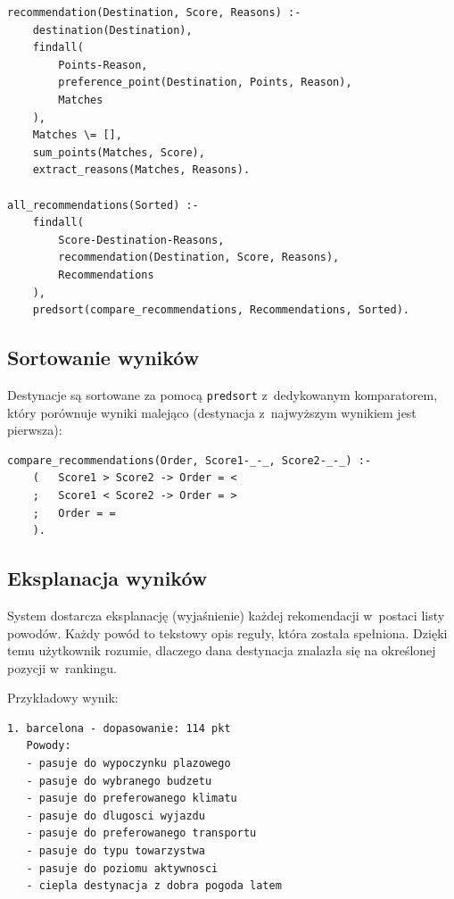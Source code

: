 \documentclass[12pt,a4paper]{article}
\begin{document}
\begin{lstlisting}[style=prolog, caption={Główny predykat rekomendacji}]
recommendation(Destination, Score, Reasons) :-
    destination(Destination),
    findall(
        Points-Reason,
        preference_point(Destination, Points, Reason),
        Matches
    ),
    Matches \= [],
    sum_points(Matches, Score),
    extract_reasons(Matches, Reasons).

all_recommendations(Sorted) :-
    findall(
        Score-Destination-Reasons,
        recommendation(Destination, Score, Reasons),
        Recommendations
    ),
    predsort(compare_recommendations, Recommendations, Sorted).
\end{lstlisting}

\subsection{Sortowanie wyników}

Destynacje są sortowane za pomocą \texttt{predsort} z~dedykowanym komparatorem, który porównuje wyniki malejąco (destynacja z~najwyższym wynikiem jest pierwsza):

\begin{lstlisting}[style=prolog, caption={Komparator do sortowania rekomendacji}]
compare_recommendations(Order, Score1-_-_, Score2-_-_) :-
    (   Score1 > Score2 -> Order = <
    ;   Score1 < Score2 -> Order = >
    ;   Order = =
    ).
\end{lstlisting}

\subsection{Eksplanacja wyników}

System dostarcza eksplanację (wyjaśnienie) każdej rekomendacji w~postaci listy powodów. Każdy powód to tekstowy opis reguły, która została spełniona. Dzięki temu użytkownik rozumie, dlaczego dana destynacja znalazła się na określonej pozycji w~rankingu.

Przykładowy wynik:
\begin{verbatim}
1. barcelona - dopasowanie: 114 pkt
   Powody:
   - pasuje do wypoczynku plazowego
   - pasuje do wybranego budzetu
   - pasuje do preferowanego klimatu
   - pasuje do dlugosci wyjazdu
   - pasuje do preferowanego transportu
   - pasuje do typu towarzystwa
   - pasuje do poziomu aktywnosci
   - ciepla destynacja z dobra pogoda latem
\end{verbatim}
\end{document}
